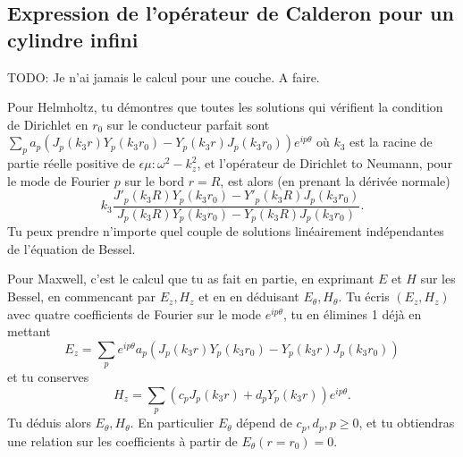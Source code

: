 \documentclass[12pt,%
    twoside,%
    a4paper,%
    openright, %
    ]{book}
\numberwithin{equation}{section} %
\renewcommand{\frac}[2]{\dfrac{#1}{#2}} %
\newcounter{REM}
\newenvironment{REM}[1][\theREM]
    {%
        \stepcounter{REM}
        \hypertarget{REM#1}{}%
        \pdfbookmark[0]{REM \theREM}{REM#1}
        \begin{tcolorbox}[%
                title={Remarque \theREM},%
                colback=red!30!white,%
                colframe=red!75!black,%
            ]
    }
    {
        \end{tcolorbox}%
    }%
\begin{document}
    \subsection{Expression de l'opérateur de Calderon pour un cylindre infini}

        \begin{REM}
            TODO: Je n'ai jamais le calcul pour une couche. A faire.
        \end{REM}
        \begin{REM}
        Pour Helmholtz, tu démontres que toutes les solutions qui vérifient la condition de Dirichlet en \(r_0\) sur le conducteur parfait sont \(\sum_p a_p(J_p(k_3r)Y_p(k_3r_0)-Y_p(k_3r)J_p(k_3r_0))e^{ip\theta}\) où \(k_3\) est la racine de partie réelle positive de \(\epsilon \mu :\omega^2-k_z^2\), et l'opérateur de Dirichlet to Neumann, pour le mode de Fourier \(p\) sur le bord \(r=R\), est alors (en prenant la dérivée normale)
        \[k_3\frac{J'_p(k_3R)Y_p(k_3r_0)-Y'_p(k_3R)J_p(k_3r_0)}{J_p(k_3R)Y_p(k_3r_0)-Y_p(k_3R)J_p(k_3r_0)}.\]
        Tu peux prendre n'importe quel couple de solutions linéairement indépendantes de l'équation de Bessel.
        
        Pour Maxwell, c'est le calcul que tu as fait en partie, en exprimant \(E\) et \(H\) sur les Bessel, en commencant par \(E_z,H_z\) et en en déduisant \(E_{\theta}, H_{\theta}\). Tu écris \((E_z, H_z)\) avec quatre coefficients de Fourier sur le mode \(e^{ip\theta}\), tu en élimines 1 déjà en mettant
        \[E_z=\sum_p e^{ip\theta}a_p(J_p(k_3r)Y_p(k_3r_0)-Y_p(k_3r)J_p(k_3r_0))\]
        et tu conserves
        \[H_z=\sum_p (c_pJ_p(k_3r)+d_pY_p(k_3r))e^{ip\theta}.\]
        Tu déduis alors \(E_{\theta}, H_{\theta}\). En particulier \(E_{\theta}\) dépend de \(c_p, d_p, p\geq 0\), et tu obtiendras une relation sur les coefficients à partir de \(E_{\theta}(r=r_0)=0\). 
        \end{REM}

\end{document}
